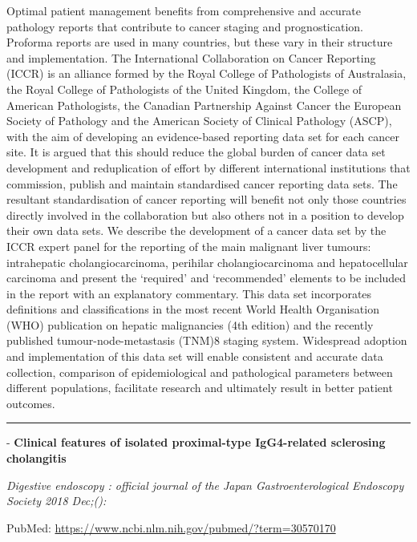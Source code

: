 \documentclass[]{article}
\begin{document}
Optimal patient management benefits from comprehensive and accurate
pathology reports that contribute to cancer staging and prognostication.
Proforma reports are used in many countries, but these vary in their
structure and implementation. The International Collaboration on Cancer
Reporting (ICCR) is an alliance formed by the Royal College of
Pathologists of Australasia, the Royal College of Pathologists of the
United Kingdom, the College of American Pathologists, the Canadian
Partnership Against Cancer the European Society of Pathology and the
American Society of Clinical Pathology (ASCP), with the aim of
developing an evidence-based reporting data set for each cancer site. It
is argued that this should reduce the global burden of cancer data set
development and reduplication of effort by different international
institutions that commission, publish and maintain standardised cancer
reporting data sets. The resultant standardisation of cancer reporting
will benefit not only those countries directly involved in the
collaboration but also others not in a position to develop their own
data sets. We describe the development of a cancer data set by the ICCR
expert panel for the reporting of the main malignant liver tumours:
intrahepatic cholangiocarcinoma, perihilar cholangiocarcinoma and
hepatocellular carcinoma and present the `required' and `recommended'
elements to be included in the report with an explanatory commentary.
This data set incorporates definitions and classifications in the most
recent World Health Organisation (WHO) publication on hepatic
malignancies (4th edition) and the recently published
tumour-node-metastasis (TNM)8 staging system. Widespread adoption and
implementation of this data set will enable consistent and accurate data
collection, comparison of epidemiological and pathological parameters
between different populations, facilitate research and ultimately result
in better patient outcomes.

{}

{}

\begin{center}\rule{0.5\linewidth}{\linethickness}\end{center}

 - \textbf{Clinical features of isolated proximal-type IgG4-related
sclerosing cholangitis}

\emph{Digestive endoscopy : official journal of the Japan
Gastroenterological Endoscopy Society 2018 Dec;():}

PubMed: \url{https://www.ncbi.nlm.nih.gov/pubmed/?term=30570170}
\end{document}
